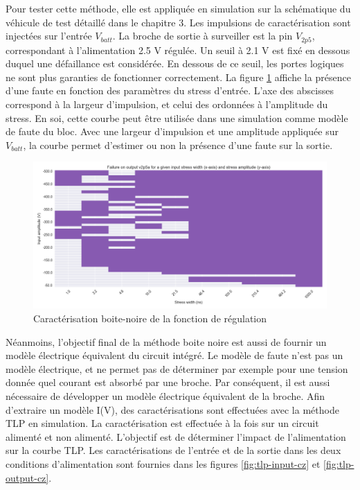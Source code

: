 Pour tester cette méthode, elle est appliquée en simulation sur la schématique du véhicule de test détaillé dans le chapitre 3.
Les impulsions de caractérisation sont injectées sur l'entrée $V_{batt}$.
La broche de sortie à surveiller est la pin $V_{2p5}$, correspondant à l'alimentation 2.5 V régulée.
Un seuil à 2.1 V est fixé en dessous duquel une défaillance est considérée.
En dessous de ce seuil, les portes logiques ne sont plus garanties de fonctionner correctement.
La figure \ref{fig:cz-black-box} affiche la présence d'une faute en fonction des paramètres du stress d'entrée.
L'axe des abscisses correspond à la largeur d'impulsion, et celui des ordonnées à l'amplitude du stress.
En soi, cette courbe peut être utilisée dans une simulation comme modèle de faute du bloc.
Avec une largeur d'impulsion et une amplitude appliquée sur $V_{batt}$, la courbe permet d'estimer ou non la présence d'une faute sur la sortie.

\begin{figure}[!h]
  \centering
  \includegraphics[width=\textwidth]{src/1/figures/black_box_regulator.png}
  \caption{Caractérisation boite-noire de la fonction de régulation}
  \label{fig:cz-black-box}
\end{figure}

Néanmoins, l'objectif final de la méthode boite noire est aussi de fournir un modèle électrique équivalent du circuit intégré.
Le modèle de faute n'est pas un modèle électrique, et ne permet pas de déterminer par exemple pour une tension donnée quel courant est absorbé par une broche.
Par conséquent, il est aussi nécessaire de développer un modèle électrique équivalent de la broche.
Afin d'extraire un modèle I(V), des caractérisations sont effectuées avec la méthode TLP en simulation.
La caractérisation est effectuée à la fois sur un circuit alimenté et non alimenté.
L'objectif est de déterminer l'impact de l'alimentation sur la courbe TLP.
Les caractérisations de l'entrée et de la sortie dans les deux conditions d'alimentation sont fournies dans les figures \ref{fig:tlp-input-cz} et \ref{fig:tlp-output-cz}.

